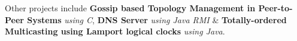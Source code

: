 \documentclass[10pt]{article}
\begin{document}
Other projects include \textbf{Gossip based Topology Management in Peer-to-Peer Systems} \textit{using C},
\textbf{DNS Server} \textit{using Java RMI} \& \textbf{Totally-ordered Multicasting using Lamport logical clocks} \textit{using Java}. 

\end{document}

